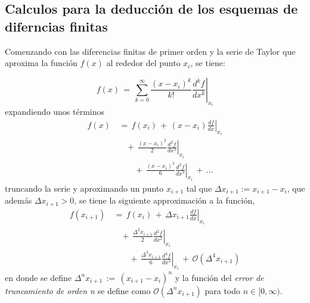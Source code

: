 \documentclass[9pt,technote,twoside,letterpaper,onecolumn]{IEEEtran}
\begin{document}
\subsection{Calculos para la deducción de los esquemas de diferncias finitas}
\begin{multicols}{2}
Comenzando con las diferencias finitas de primer orden y la serie de Taylor que aproxima la función $f(x)$ al rededor del punto $x_i$, se tiene:

\begin{equation}
  f(x)\,=\,\sum^\infty_{k=0}\frac{(x-x_i)^k}{k!}\left.\frac{d^kf}{dx^k}\right|_{x_i}
  \label{eq:taylor}
\end{equation}
expandiendo unos términos
\begin{equation}
  \begin{split}
    f(x)&\,=\,f(x_i)\,+\,(x-x_i)\left.\frac{df}{dx}\right|_{x_i}\\
    &\quad+\,\frac{(x-x_i)^2}{2}\left.\frac{d^2f}{dx^2}\right|_{x_i}\\
    &\qquad+\,\frac{(x-x_i)^3}{6}\left.\frac{d^3f}{dx^3}\right|_{x_i}\,+\,\ldots
  \end{split}
  \label{eq:taylorexp}
\end{equation}
truncando la serie y aproximando un punto $x_{i+1}$ tal que $\Delta x_{i+1}:=x_{i+1}-x_i$, que además $\Delta x_{i+1}>0$, se tiene la siguiente approximación a la función,
\begin{equation}
  \begin{split}
    f(x_{i+1})&\,=\,f(x_i)\,+\,\Delta x_{i+1}\left.\frac{df}{dx}\right|_{x_i}\\
    &\quad+\,\frac{\Delta^2 x_{i+1}}{2}\left.\frac{d^2f}{dx^2}\right|_{x_i}\\
    &\qquad+\,\frac{\Delta^3 x_{i+1}}{6}\left.\frac{d^3f}{dx^3}\right|_{x_i}\,+\,\mathcal{O}(\Delta^4 x_{i+1})
  \end{split}
  \label{eq:taylorapprx}
\end{equation}
en donde se define $\Delta^n x_{i+1}\,:=\,(x_{i+1}-x_i)^n$ y la función del \emph{error de truncamiento de orden n} se define como $\mathcal{O}(\Delta^n x_{i+1})$ para todo $n\in[0,\infty)$.


\end{multicols}
\end{document}
